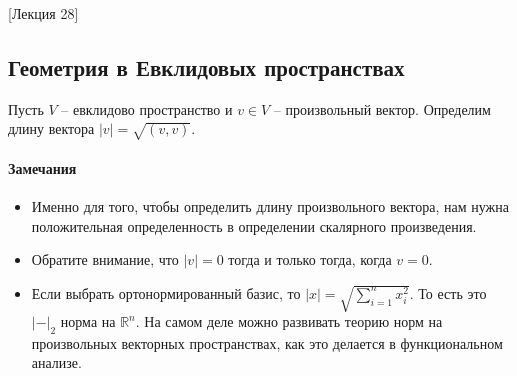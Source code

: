 [Лекция 28]


\subsection{Геометрия в Евклидовых пространствах}

\begin{definition}
Пусть $V$ -- евклидово пространство и $v\in V$ -- произвольный вектор.
Определим длину вектора $|v| = \sqrt{(v,v)}$.
\end{definition}

\paragraph{Замечания}

\begin{itemize}
\item Именно для того, чтобы определить длину произвольного вектора, нам нужна положительная определенность в определении скалярного произведения.

\item Обратите внимание, что $|v| = 0$ тогда и только тогда, когда $v = 0$.

\item Если выбрать ортонормированный базис, то $|x| = \sqrt{\sum_{i=1}^n x_i^2}$.
То есть это $|{-}|_2$ норма на $\mathbb R^n$.
На самом деле можно развивать теорию норм на произвольных векторных пространствах, как это делается в функциональном анализе.
\end{itemize}

